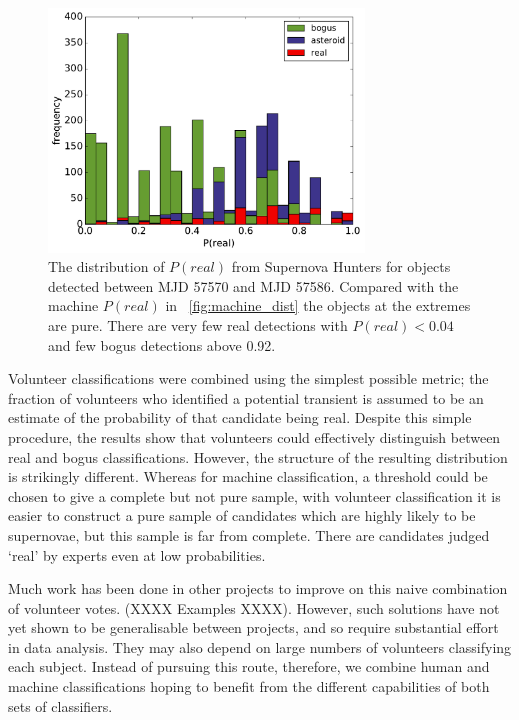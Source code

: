 \documentclass[a4paper,fleqn,usenatbib]{mnras}
\begin{document}
\begin{figure}
   \includegraphics[width=84mm]{figs/human_hist.pdf}
   \caption{The distribution of $P(real)$ from Supernova Hunters for objects detected between 
            MJD 57570 and MJD 57586.  Compared with the machine $P(real)$ in ~\ref{fig:machine_dist}
            the objects at the extremes are pure.  There are very few real detections with 
            $P(real) < 0.04$ and few bogus detections above 0.92.} 
   \label{fig:human_dist} 
\end{figure}

Volunteer classifications were combined using the simplest possible metric; the fraction of volunteers who identified a potential transient is assumed to be an estimate of the probability of that candidate being real. Despite this simple procedure, the results show that volunteers could effectively distinguish between real and bogus classifications. However, the structure of the resulting distribution is strikingly different. Whereas for machine classification, a threshold could be chosen to give a complete but not pure sample, with volunteer classification it is easier to construct a pure sample of candidates which are highly likely to be supernovae, but this sample is far from complete. There are candidates judged `real' by experts even at low probabilities. 

Much work has been done in other projects to improve on this naive combination of volunteer votes. (XXXX Examples XXXX). However, such solutions have not yet shown to be generalisable between projects, and so require substantial effort in data analysis. They may also depend on large numbers of volunteers classifying each subject. Instead of pursuing this route, therefore, we combine human and machine classifications hoping to benefit from the different capabilities of both sets of classifiers. 
\end{document}

